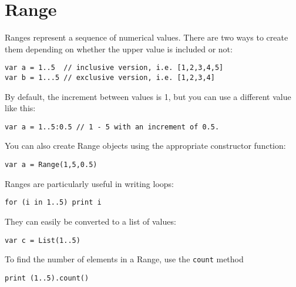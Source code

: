 \hypertarget{range}{%
\section{Range}\label{range}}

Ranges represent a sequence of numerical values. There are two ways to
create them depending on whether the upper value is included or not:

\begin{lstlisting}
var a = 1..5  // inclusive version, i.e. [1,2,3,4,5]
var b = 1...5 // exclusive version, i.e. [1,2,3,4]
\end{lstlisting}

By default, the increment between values is 1, but you can use a
different value like this:

\begin{lstlisting}
var a = 1..5:0.5 // 1 - 5 with an increment of 0.5.
\end{lstlisting}

You can also create Range objects using the appropriate constructor
function:

\begin{lstlisting}
var a = Range(1,5,0.5)
\end{lstlisting}

Ranges are particularly useful in writing loops:

\begin{lstlisting}
for (i in 1..5) print i
\end{lstlisting}

They can easily be converted to a list of values:

\begin{lstlisting}
var c = List(1..5)
\end{lstlisting}

To find the number of elements in a Range, use the \texttt{count} method

\begin{lstlisting}
print (1..5).count()
\end{lstlisting}
